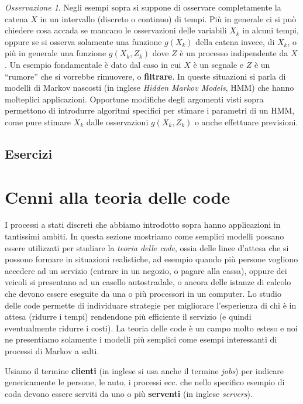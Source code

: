 \documentclass[
  italian,
  letterpaper,
]{book}
\theoremstyle{definition}
\theoremstyle{remark}
\newtheorem*{remark}{Osservazione}
\begin{document}
\begin{remark}
Negli esempi sopra si suppone di osservare completamente la catena \(X\)
in un intervallo (discreto o continuo) di tempi. Più in generale ci si
può chiedere cosa accada se mancano le osservazioni delle variabili
\(X_k\) in alcuni tempi, oppure se si osserva solamente una funzione
\(g(X_k)\) della catena invece, di \(X_k\), o più in generale una
funzione \(g(X_k, Z_k)\) dove \(Z\) è un processo indipendente da \(X\).
Un esempio fondamentale è dato dal caso in cui \(X\) è un segnale e
\(Z\) è un ``rumore'' che si vorrebbe rimuovere, o \textbf{filtrare}. In
queste situazioni si parla di modelli di Markov nascosti (in inglese
\emph{Hidden Markov Models}, HMM) che hanno molteplici applicazioni.
Opportune modifiche degli argomenti visti sopra permettono di introdurre
algoritmi specifici per stimare i parametri di un HMM, come pure stimare
\(X_k\) dalle osservazioni \(g(X_k, Z_k)\) o anche effettuare
previsioni.
\end{remark}

\subsection{Esercizi}\label{esercizi-37}

\section{Cenni alla teoria delle code}\label{sec-code}

I processi a stati discreti che abbiamo introdotto sopra hanno
applicazioni in tantissimi ambiti. In questa sezione mostriamo come
semplici modelli possano essere utilizzati per studiare la \emph{teoria
delle code}, ossia delle linee d'attesa che si possono formare in
situazioni realistiche, ad esempio quando più persone vogliono accedere
ad un servizio (entrare in un negozio, o pagare alla cassa), oppure dei
veicoli si presentano ad un casello autostradale, o ancora delle istanze
di calcolo che devono essere eseguite da una o più processori in un
computer. Lo studio delle code permette di individuare strategie per
migliorare l'esperienza di chi è in attesa (ridurre i tempi) rendendone
più efficiente il servizio (e quindi eventualmente ridurre i costi). La
teoria delle code è un campo molto esteso e noi ne presentiamo solamente
i modelli più semplici come esempi interessanti di processi di Markov a
salti.

Usiamo il termine \textbf{clienti} (in inglese si usa anche il termine
\emph{jobs}) per indicare genericamente le persone, le auto, i processi
ecc. che nello specifico esempio di coda devono essere serviti da uno o
più \textbf{serventi} (in inglese \emph{servers}).
\end{document}
